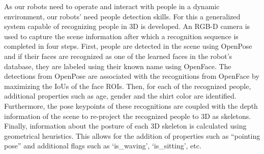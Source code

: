 \label{sec:pers_recog}
As our robots need to operate and interact with people in a dynamic environment, our robots’ need people detection skills. For this a generalized system capable of recognizing people in 3D is developed. An RGB-D camera is used to capture the scene information after which a recognition sequence is completed in four steps. First, people are detected in the scene using OpenPose and if their faces are recognized as one of the learned faces in the robot's database, they are labeled using their known name using OpenFace. The detections from OpenPose are associated with the recognitions from OpenFace by maximizing the IoUs of the face ROIs. Then, for each of the recognized people, additional properties such as age, gender and the shirt color are identified. Furthermore, the pose keypoints of these recognitions are coupled with the depth information of the scene to re-project the recognized people to 3D as skeletons. Finally, information about the posture of each 3D skeleton is calculated using geometrical heuristics. This allows for the addition of properties such as “pointing pose” and additional flags such as `is\_waving', `is\_sitting', etc.
%
